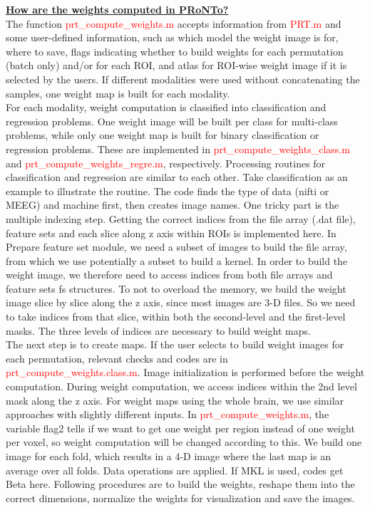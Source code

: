 \noindent \underline{\textbf{How are the weights computed in PRoNTo?}}
\\
 
The function \textcolor{red}{prt\_compute\_weights.m} accepts information from \textcolor{red}{PRT.m} and some user-defined information, such as which model the weight image is for, where to save, flags indicating whether to build weights for each permutation (batch only) and/or for each ROI, and atlas for ROI-wise weight image if it is selected by the users. If different modalities were used without concatenating the samples, one weight map is built for each modality.
\\
 
For each modality, weight computation is classified into classification and regression problems. One weight image will be built per class for multi-class problems, while only one weight map is built for binary classification or regression problems. These are implemented in \textcolor{red}{prt\_compute\_weights\_class.m} and \textcolor{red}{prt\_compute\_weights\_regre.m}, respectively. Processing routines for classification and regression are similar to each other. Take classification as an example to illustrate the routine. The code finds the type of data (nifti or MEEG) and machine first, then creates image names. One tricky part is the multiple indexing step. Getting the correct indices from the file array (.dat file), feature sets and each slice along z axis within ROIs is implemented here. In Prepare feature set module, we need a subset of images to build the file array, from which we use potentially a subset to build a kernel. In order to build the weight image, we therefore need to access indices from both file arrays and feature sets fs structures. To not to overload the memory, we build the weight image slice by slice along the z axis, since most images are 3-D files. So we need to take indices from that slice, within both the second-level and the first-level masks. The three levels of indices are necessary to build weight maps.
\\
 
The next step is to create maps. If the user selects to build weight images for each permutation, relevant checks and codes are in \textcolor{red}{prt\_compute\_weights.class.m}. Image initialization is performed before the weight computation. During weight computation, we access indices within the 2nd level mask along the z axis. For weight maps using the whole brain, we use similar approaches with slightly different inputs. In \textcolor{red}{prt\_compute\_weights.m}, the variable flag2 tells if we want to get one weight per region instead of one weight per voxel, so weight computation will be changed according to this. We build one image for each fold, which results in a 4-D image where the last map is an average over all folds. Data operations are applied. If MKL is used, codes get Beta here. Following procedures are to build the weights, reshape them into the correct dimensions, normalize the weights for visualization and save the images.
\\
 
